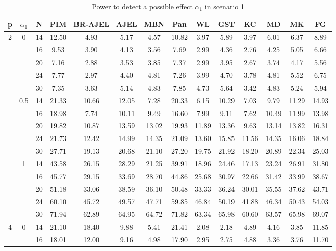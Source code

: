 \documentclass[num-refs]{wiley-article}
\begin{document}
\begin{table}
\caption{Power to detect a possible effect $\alpha_1$ in scenario 1}
\scriptsize
\centering
\begin{tabular}[t]{cccccccccccccc}
\hline
p & $\alpha_1$ & N & PIM & BR-AJEL & AJEL & MBN & Pan & WL & GST & KC & MD & MK & FG\\
\hline
2 & 0 & 14 & 12.50 & 4.93 & 5.17 & 4.57 & 10.82 & 3.97 & 5.89 & 3.97 & 6.01 & 6.37 & 8.89\\
& & 16 & 9.53 & 3.90 & 4.13 & 3.56 & 7.69 & 2.99 & 4.36 & 2.76 & 4.25 & 5.05 & 6.66\\
& & 20 & 7.16 & 2.88 & 3.53 & 3.85 & 7.37 & 2.99 & 3.95 & 2.67 & 3.74 & 4.17 & 5.56\\
& & 24 & 7.77 & 2.97 & 4.40 & 4.81 & 7.26 & 3.99 & 4.70 & 3.78 & 4.81 & 5.52 & 6.75\\
& & 30 & 7.35 & 3.63 & 5.14 & 4.83 & 7.85 & 4.73 & 5.64 & 3.42 & 4.83 & 5.24 & 5.94\\
\hline
& 0.5 & 14 & 21.33 & 10.66 & 12.05 & 7.28 & 20.33 & 6.15 & 10.29 & 7.03 & 9.79 & 11.29 & 14.93\\
& & 16 & 18.98 & 7.74 & 10.11 & 9.49 & 16.60 & 7.99 & 9.11 & 7.62 & 10.49 & 11.99 & 13.98\\
& & 20 & 19.82 & 10.87 & 13.59 & 13.02 & 19.93 & 11.89 & 13.36 & 9.63 & 13.14 & 13.82 & 16.31\\
& & 24 & 21.73 & 12.42 & 14.99 & 14.35 & 21.09 & 13.60 & 15.85 & 11.56 & 14.35 & 16.06 & 18.84\\
& & 30 & 27.71 & 19.13 & 20.68 & 21.10 & 27.20 & 19.75 & 21.92 & 18.20 & 20.89 & 22.34 & 25.03\\
\hline
 & 1 & 14 & 43.58 & 26.15 & 28.29 & 21.25 & 39.91 & 18.96 & 24.46 & 17.13 & 23.24 & 26.91 & 31.80\\
& & 16 & 45.77 & 29.15 & 33.69 & 28.70 & 44.86 & 25.68 & 30.97 & 22.66 & 31.42 & 33.99 & 38.67\\
& & 20 & 51.18 & 33.06 & 38.59 & 36.10 & 50.48 & 33.33 & 36.24 & 30.01 & 35.55 & 37.62 & 43.71\\
& & 24 & 60.10 & 45.72 & 49.57 & 47.71 & 59.85 & 46.84 & 50.19 & 41.88 & 46.34 & 50.43 & 54.03\\
& & 30 & 71.94 & 62.89 & 64.95 & 64.72 & 71.82 & 63.34 & 65.98 & 60.60 & 63.57 & 65.98 & 69.07\\
\hline
4 & 0 & 14 & 21.10 & 18.40 & 9.88 & 5.41 & 21.41 & 2.08 & 2.18 & 4.89 & 4.16 & 3.85 & 11.85\\
& & 16 & 18.01 & 12.00 & 9.16 & 4.98 & 17.90 & 2.95 & 2.75 & 4.88 & 3.36 & 3.76 & 11.70\\

\end{tabular}
\end{table}
\end{document}
